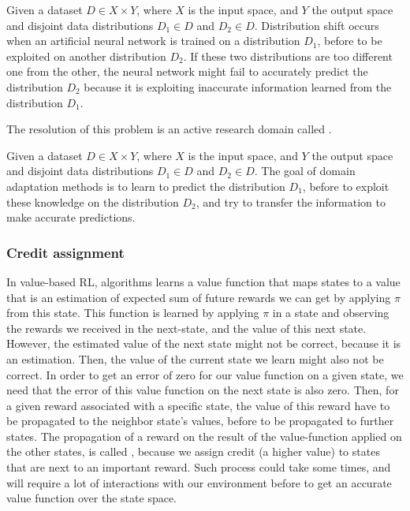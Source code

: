 \begin{definition}
    Given a dataset $D \in X \times Y$, where $X$ is the input space, and $Y$ the output space and disjoint data
    distributions $D_1 \in D$ and $D_2 \in D$.
    Distribution shift occurs when an artificial neural network is trained on a distribution $D_1$, before to be
    exploited on another distribution $D_2$.
    If these two distributions are too different one from the other, the neural network might fail to accurately predict
    the distribution $D_2$ because it is exploiting inaccurate information learned from the distribution $D_1$.
\end{definition}

The resolution of this problem is an active research domain called .

\begin{definition}
    Given a dataset $D \in X \times Y$, where $X$ is the input space, and $Y$ the output space and disjoint data
    distributions $D_1 \in D$ and $D_2 \in D$.
    The goal of domain adaptation methods is to learn to predict the distribution $D_1$, before to
    exploit these knowledge on the distribution $D_2$, and try to transfer the information to make accurate predictions.
\end{definition}

\subsubsection{Credit assignment}

In value-based RL, algorithms learns a value function that maps states to a value that is an estimation of expected sum
of future rewards we can get by applying $\pi$ from this state.
This function is learned by applying $\pi$ in a state and observing the rewards we received in the next-state, and the
value of this next state.
However, the estimated value of the next state might not be correct, because it is an estimation.
Then, the value of the current state we learn might also not be correct.
In order to get an error of zero for our value function on a given state, we need that the error of this value function
on the next state is also zero.
Then, for a given reward associated with a specific state, the value of this reward have to be propagated to the
neighbor state's values, before to be propagated to further states.
The propagation of a reward on the result of the value-function applied on the other states, is called
, because we assign credit (a higher value) to states that are next to an important reward.
Such process could take some times, and will require a lot of interactions with our environment before to get an
accurate value function over the state space.

